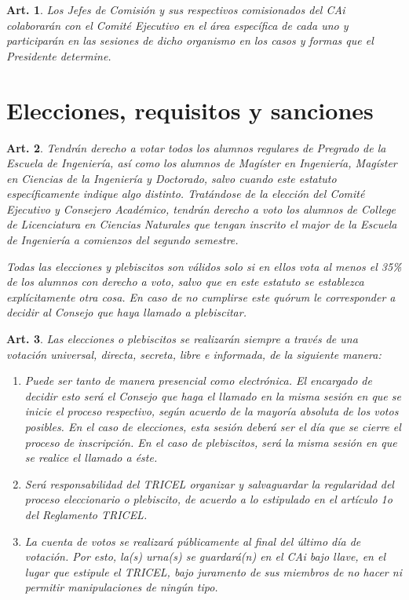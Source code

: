 \documentclass[letterpaper,11pt]{article}
\theoremstyle{plain}
\newtheorem{art}{Art.} %
\begin{document}
		\begin{art}
			Los Jefes de Comisión y sus respectivos comisionados del CAi colaborarán con el Comité Ejecutivo en el área específica de cada uno y participarán en las sesiones de dicho organismo en los casos y formas que el Presidente determine.
		\end{art}

	\section{Elecciones, requisitos y sanciones}\label{elecciones}

		\begin{art}\label{porcentajeMinimo}
			Tendrán derecho a votar todos los alumnos regulares de Pregrado de la Escuela de Ingeniería, así como los alumnos de Magíster en Ingeniería, Magíster en Ciencias de la Ingeniería y Doctorado, salvo cuando este estatuto específicamente indique algo distinto. Tratándose de la elección del Comité Ejecutivo y Consejero Académico, tendrán derecho a voto los alumnos de College de Licenciatura en Ciencias Naturales que tengan inscrito el major de la Escuela de Ingeniería a comienzos del segundo semestre.

			Todas las elecciones y plebiscitos son válidos solo si en ellos vota al menos el 35\% de los alumnos con derecho a voto, salvo que en este estatuto se establezca explícitamente otra cosa. En caso de no cumplirse este quórum le corresponder a decidir al Consejo que haya llamado a plebiscitar.
		\end{art}

		\begin{art}\label{definicionEleccionesYPlebiscitos}
			Las elecciones o plebiscitos se realizarán siempre a través de una votación universal, directa, secreta, libre e informada, de la siguiente manera:
			\begin{enumerate}
				\item Puede ser tanto de manera presencial como electrónica. El encargado de decidir esto será el Consejo que haga el llamado en la misma sesión en que se inicie el proceso respectivo, según acuerdo de la mayoría absoluta de los votos posibles. En el caso de elecciones, esta sesión deberá ser el día que se cierre el proceso de inscripción. En el caso de plebiscitos, será la misma sesión en que se realice el llamado a éste.
				\item Será responsabilidad del \emph{TRICEL} organizar y salvaguardar la regularidad del proceso eleccionario o plebiscito, de acuerdo a lo estipulado en el artículo 1o del Reglamento \emph{TRICEL}.
				\item La cuenta de votos se realizará públicamente al final del último día de votación. Por esto, la(s) urna(s) se guardará(n) en el CAi bajo llave, en el lugar que estipule el TRICEL, bajo juramento de sus miembros de no hacer ni permitir manipulaciones de ningún tipo.
			\end{enumerate}
		\end{art}
\end{document}
